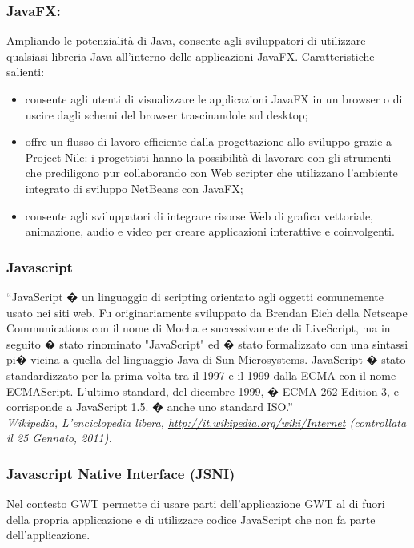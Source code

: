 \subsubsection*{JavaFX:} Ampliando le potenzialit\`a di Java, consente agli
sviluppatori di utilizzare qualsiasi libreria Java all'interno delle applicazioni JavaFX.
Caratteristiche salienti:
\begin{itemize}
\item consente agli utenti di visualizzare le applicazioni JavaFX in un browser
o di uscire dagli schemi del browser trascinandole sul desktop; 
\item offre un flusso di lavoro efficiente dalla progettazione allo sviluppo
grazie a Project Nile: i progettisti hanno la possibilit\`a di lavorare con gli strumenti
che prediligono pur collaborando con Web scripter che utilizzano l'ambiente
integrato di sviluppo NetBeans con JavaFX;
\item consente agli sviluppatori di integrare risorse Web di grafica vettoriale,
animazione, audio e video per creare applicazioni interattive e coinvolgenti.
\end{itemize}

\subsubsection*{Javascript}
``JavaScript � un linguaggio di scripting orientato agli oggetti comunemente
usato nei siti web. Fu originariamente sviluppato da Brendan Eich della Netscape
Communications con il nome di Mocha e successivamente di LiveScript, ma in
seguito � stato rinominato "JavaScript" ed � stato formalizzato con una sintassi
pi� vicina a quella del linguaggio Java di Sun Microsystems. JavaScript � stato
standardizzato per la prima volta tra il 1997 e il 1999 dalla ECMA con il nome
ECMAScript. L'ultimo standard, del dicembre 1999, � ECMA-262 Edition 3, e
corrisponde a JavaScript 1.5. � anche uno standard ISO.''\\ 
\emph{Wikipedia, L'enciclopedia libera,
\url{http://it.wikipedia.org/wiki/Internet} (controllata il 25 Gennaio, 2011).}


\subsubsection*{Javascript Native Interface (JSNI)}
Nel contesto GWT permette di usare parti dell'applicazione GWT al di fuori della
propria applicazione e di utilizzare codice JavaScript che non fa parte
dell'applicazione.

